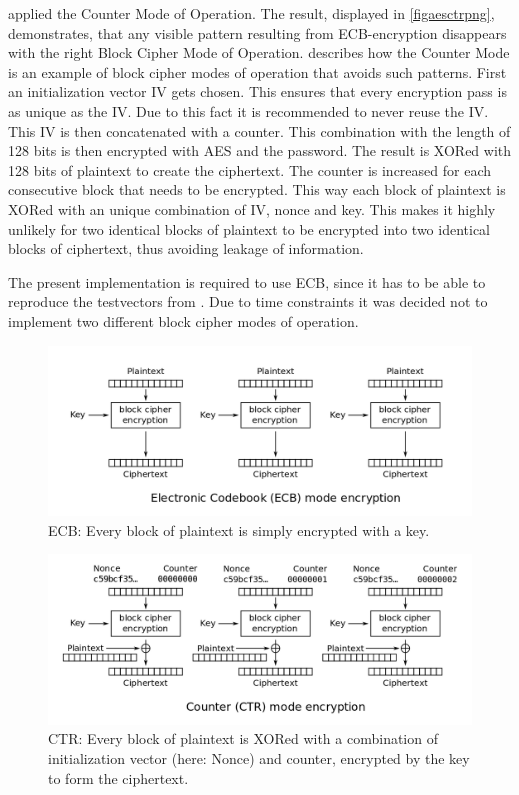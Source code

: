 applied the Counter Mode of Operation. The result, displayed in \ref{figaesctrpng}, demonstrates, that any visible pattern resulting from
ECB-encryption disappears with the right Block Cipher Mode of Operation.
\cite[ch. 5.1.5]{paar} describes how the Counter Mode is an example of block
cipher modes of operation that avoids such patterns. First an
initialization vector IV gets chosen. This ensures that every
encryption pass is as unique as the IV. Due to this fact it is
recommended to never reuse the IV. This IV is then concatenated with a counter.
This combination with the length of 128 bits is then encrypted with AES
and the password. The result is XORed with 128 bits of plaintext to
create the ciphertext. The counter is increased for each consecutive
block that needs to be encrypted. This way each block of plaintext is
XORed with an unique combination of IV, nonce and key. This makes it
highly unlikely for two identical blocks of plaintext to be encrypted
into two identical blocks of ciphertext, thus avoiding leakage of
information.

The present implementation is required to use ECB, since it has to be
able to reproduce the testvectors from \cite[Ap. B, Ap. C.1]{fips197}. Due to time constraints
it was decided not to implement two different block cipher modes of
operation.

\begin{figure}
\centering
\includegraphics[scale = 0.25]{data/figures/ECB_encryption.png}
\caption{ECB: Every block of plaintext is simply encrypted with a key.}
\end{figure}

\begin{figure}
\centering
\includegraphics[scale = 0.25]{data/figures/CTR_encryption.png}
\caption{CTR: Every block of plaintext is XORed with a combination of initialization vector (here: Nonce) and counter, encrypted by the key to form the ciphertext.}
\end{figure}

